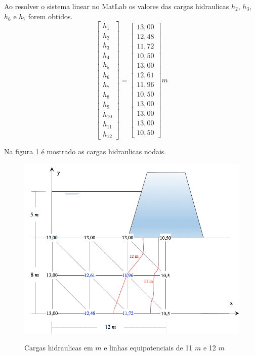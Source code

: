\documentclass{article} %
\begin{document}
Ao resolver o sistema linear no MatLab os valores das cargas hidraulicas \(h_2\), \(h_3\), \(h_6\) e \(h_7\) forem obtidos.
\begin{equation}
\begin{bmatrix}
h_1\\h_2\\h_3\\h_4\\h_5\\h_6\\h_7\\h_8\\h_9\\h_{10}\\h_{11}\\h_{12}
\end{bmatrix}=\begin{bmatrix}
13,00\\12,48\\11,72\\10,50\\13,00\\12,61\\11,96\\10,50\\13,00\\13,00\\13,00\\10,50
\end{bmatrix}m
\end{equation}

Na figura \ref{result} é mostrado as cargas hidraulicas nodais.
\begin{figure}[H]
	\centering
	\caption{Cargas hidraulicas em \(m\) e linhas equipotenciais de 11 \(m\) e 12 \(m\)}
	\includegraphics[width=0.75\linewidth]{result}	
	\label{result}	
\end{figure}
\end{document}
